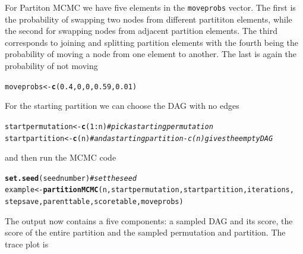 \documentclass[a4paper]{article}\usepackage[]{graphicx}\usepackage[]{color}
\makeatletter
\newcommand{\hlnum}[1]{\textcolor[rgb]{0.686,0.059,0.569}{#1}}%
\newcommand{\hlcom}[1]{\textcolor[rgb]{0.678,0.584,0.686}{\textit{#1}}}%
\newcommand{\hlopt}[1]{\textcolor[rgb]{0,0,0}{#1}}%
\newcommand{\hlstd}[1]{\textcolor[rgb]{0.345,0.345,0.345}{#1}}%
\newcommand{\hlkwb}[1]{\textcolor[rgb]{0.69,0.353,0.396}{#1}}%
\newcommand{\hlkwd}[1]{\textcolor[rgb]{0.737,0.353,0.396}{\textbf{#1}}}%
\newenvironment{kframe}{%
 \def\at@end@of@kframe{}%
 \ifinner\ifhmode%
  \def\at@end@of@kframe{\end{minipage}}%
  \begin{minipage}{\columnwidth}%
 \fi\fi%
 \def\FrameCommand##1{\hskip\@totalleftmargin \hskip-\fboxsep
 \colorbox{shadecolor}{##1}\hskip-\fboxsep
     \hskip-\linewidth \hskip-\@totalleftmargin \hskip\columnwidth}%
 \MakeFramed {\advance\hsize-\width
   \@totalleftmargin\z@ \linewidth\hsize
   \@setminipage}}%
 {\par\unskip\endMakeFramed%
 \at@end@of@kframe}
\newenvironment{knitrout}{}{} %
\newcommand{\nn}{\noindent}
\makeatother
\begin{document}
\nn For Partiton MCMC we have five elements in the \texttt{moveprobs} vector.  The first is the probability of swapping two nodes from different partititon elements, while the second for swapping nodes from adjacent partition elements.  The third corresponds to joining and splitting partition elements with the fourth being the probability of moving a node from one element to another.  The last is again the probability of not moving

\begin{knitrout}
\color{fgcolor}\begin{kframe}
\begin{alltt}
\hlstd{moveprobs} \hlkwb{<-} \hlkwd{c}\hlstd{(}\hlnum{0.4}\hlstd{,} \hlnum{0}\hlstd{,} \hlnum{0}\hlstd{,} \hlnum{0.59}\hlstd{,} \hlnum{0.01}\hlstd{)}
\end{alltt}
\end{kframe}
\end{knitrout}

\nn For the starting partition we can choose the DAG with no edges

\begin{knitrout}
\color{fgcolor}\begin{kframe}
\begin{alltt}
\hlstd{startpermutation} \hlkwb{<-} \hlkwd{c}\hlstd{(}\hlnum{1}\hlopt{:}\hlstd{n)}  \hlcom{# pick a starting permutation}
\hlstd{startpartition} \hlkwb{<-} \hlkwd{c}\hlstd{(n)}  \hlcom{# and a starting partition - c(n) gives the empty DAG}
\end{alltt}
\end{kframe}
\end{knitrout}

\nn and then run the MCMC code

\begin{knitrout}
\color{fgcolor}\begin{kframe}
\begin{alltt}
\hlkwd{set.seed}\hlstd{(seednumber)}  \hlcom{# set the seed}
\hlstd{example} \hlkwb{<-} \hlkwd{partitionMCMC}\hlstd{(n, startpermutation, startpartition, iterations,}
    \hlstd{stepsave, parenttable, scoretable, moveprobs)}
\end{alltt}
\end{kframe}
\end{knitrout}

\nn The output now contains a five components: a sampled DAG and its score, the score of the entire partition and the sampled permutation and partition.  The trace plot is
\end{document}
